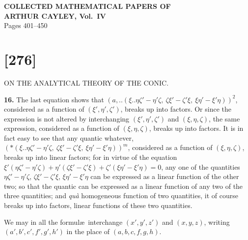 \documentclass[12pt,a4paper]{article}
\newcommand{\qform}[2]{(#1 \mathbin{..} #2)}
\theoremstyle{definition}
\begin{document}
\begin{center}
{\Large\bfseries COLLECTED MATHEMATICAL PAPERS OF\\[0.5em] ARTHUR CAYLEY, Vol.~IV}\\[1em]
{\large Pages 401--450}
\end{center}
\thispagestyle{empty}
\tableofcontents
\newpage

\newpage
\section*{[276]}
\begin{center}
{\large ON THE ANALYTICAL THEORY OF THE CONIC.}
\end{center}

\textbf{16.} The last equation shows that $(a,..\!\qform{\xi}{\eta\zeta' - \eta'\zeta,\ \zeta\xi' - \zeta'\xi,\ \xi\eta' - \xi'\eta})^{2}$, considered as a function of $(\xi', \eta', \zeta')$, breaks up into factors. Or since the expression is not altered by interchanging $(\xi', \eta', \zeta')$ and $(\xi, \eta, \zeta)$, the same expression, considered as a function of $(\xi, \eta, \zeta)$, breaks up into factors. It is in fact easy to see that any quantic whatever, $(*\!\qform{\xi}{\eta\zeta' - \eta'\zeta,\ \zeta\xi' - \zeta'\xi,\ \xi\eta' - \xi'\eta})^{m}$, considered as a function of $(\xi, \eta, \zeta)$, breaks up into linear factors; for in virtue of the equation $\xi'(\eta\zeta' - \eta'\zeta) + \eta'(\zeta\xi' - \zeta'\xi) + \zeta'(\xi\eta' - \xi'\eta) = 0$, any one of the quantities $\eta\zeta' - \eta'\zeta$, $\zeta\xi' - \zeta'\xi$, $\xi\eta' - \xi'\eta$ can be expressed as a linear function of the other two; so that the quantic can be expressed as a linear function of any two of the three quantities; and \textit{qu\`a} homogeneous function of two quantities, it of course breaks up into factors, linear functions of these two quantities.

We may in all the formul\ae\ interchange $(x', y', z')$ and $(x, y, z)$, writing $(a', b', c', f', g', h')$ in the place of $(a, b, c, f, g, h)$.
\end{document}
